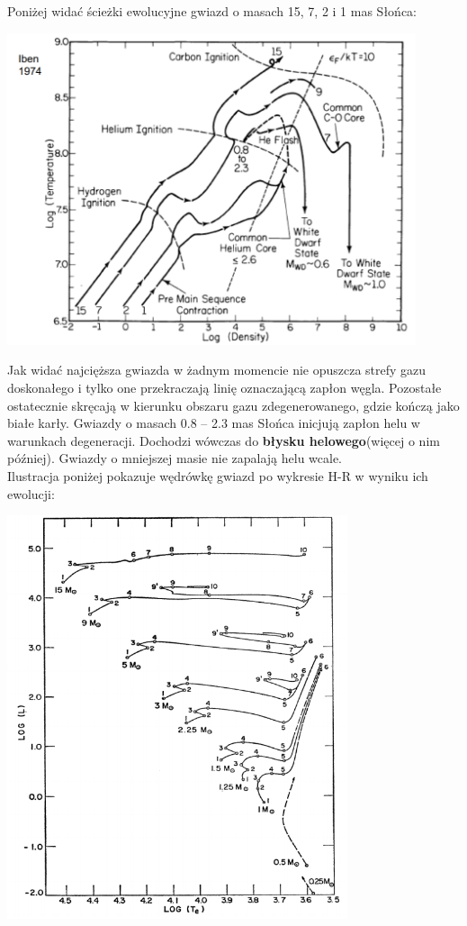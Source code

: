 \documentclass[../index.tex]{subfiles}
\begin{document}
        Poniżej widać ścieżki ewolucyjne gwiazd o masach 15, 7, 2 i 1 mas Słońca:
        \begin{center}
            \includegraphics[width=12cm]{images/logRho_CT_C.png}
        \end{center}
        Jak widać najcięższa gwiazda w żadnym momencie nie opuszcza strefy gazu doskonałego i tylko one przekraczają linię oznaczającą zapłon węgla. Pozostałe ostatecznie skręcają w kierunku obszaru gazu zdegenerowanego, gdzie kończą jako białe karły. Gwiazdy o masach 0.8 – 2.3 mas Słońca inicjują zapłon helu w warunkach degeneracji. Dochodzi wówczas do \textbf{błysku helowego}(więcej o nim później). Gwiazdy o mniejszej masie nie zapalają helu wcale.\\
        Ilustracja poniżej pokazuje wędrówkę gwiazd po wykresie H-R w wyniku ich ewolucji:
        \begin{center}
            \includegraphics[width=10cm]{images/ewolucjaGwiazdHRII.png}
        \end{center}
\end{document}
